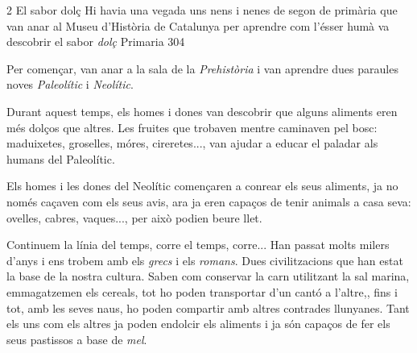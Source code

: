 \begin{news}
{2} %
{El sabor dolç}
{Hi havia una vegada uns nens i nenes de segon de primària que van anar al Museu d’Història de Catalunya per aprendre com l’ésser humà va descobrir el sabor \emph{dolç}}
{Primaria}
{304} %

\noindent{}

Per començar, van anar a la sala de la \emph{Prehistòria} i van aprendre dues paraules noves \emph{Paleolític} i \emph{Neolític}.

Durant aquest temps, els homes i dones van descobrir que alguns aliments eren més dolços que altres. Les fruites que trobaven mentre caminaven pel bosc: maduixetes, groselles, móres, cireretes..., van ajudar a educar el paladar als humans del Paleolític. 

Els homes i les dones del Neolític començaren a conrear els seus aliments, ja no només caçaven com els seus avis, ara ja eren  capaços de tenir animals a casa seva: ovelles, cabres, vaques..., per això podien beure llet.

Continuem la línia del temps, corre el temps, corre... Han passat molts milers d’anys i ens trobem amb els \emph{grecs} i els \emph{romans}. Dues civilitzacions que han estat la base de la nostra cultura. Saben com conservar la carn utilitzant la sal marina, emmagatzemen els cereals, tot ho poden transportar d’un cantó a l’altre,, fins i tot, amb les seves naus, ho poden compartir amb altres contrades llunyanes. Tant els uns com els altres ja poden endolcir els aliments i ja són capaços de fer els seus pastissos  a base de \emph{mel}.


\end{news}
